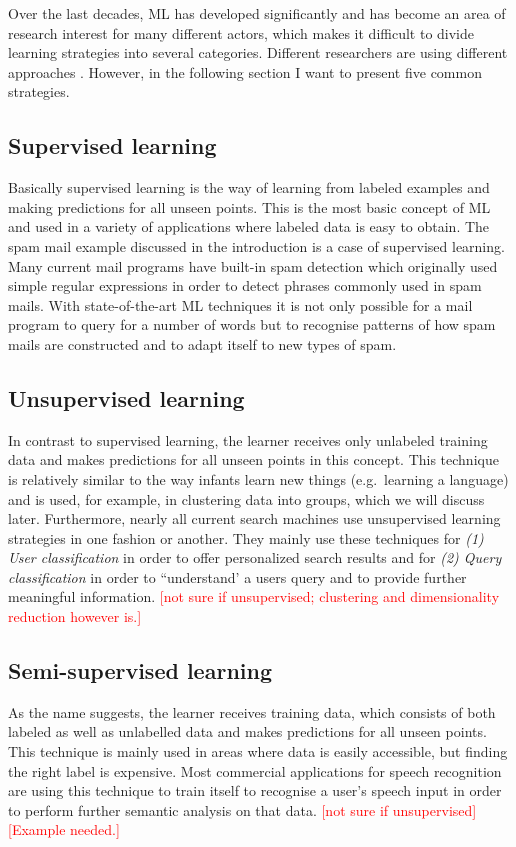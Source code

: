 \documentclass[conference]{IEEEtran}
\newcommand\notes[1]{\textcolor{red}{#1}}
\begin{document}
Over the last decades, ML has developed significantly and has become an area of
research interest for many different actors, which makes it difficult to divide learning 
strategies into several categories. Different researchers are using different approaches 
\cite{FoundationsOfML:mohri}\cite{Structure:corne}. 
However, in the following section I want to present five common strategies\cite{FoundationsOfML:mohri}.

\subsection{Supervised learning}
Basically supervised learning is the way of learning from labeled examples and making predictions 
for all unseen points. This is the most basic concept of ML and used in a variety of applications 
where labeled data is easy to obtain. The spam mail example discussed in the introduction is a 
case of supervised learning.
Many current mail programs have built-in spam detection which originally used
simple regular expressions in order to detect phrases commonly used in spam mails.
With state-of-the-art ML techniques it is not only possible for a mail program to 
query for a number of words but to recognise patterns of how spam mails are constructed and 
to adapt itself to new types of spam.

\subsection{Unsupervised learning}
In contrast to supervised learning, the learner receives only 
unlabeled training data and makes predictions for all unseen points in this concept. This technique is 
relatively similar to the way infants learn new things (e.g.\ learning a language) and 
is used, for example, in clustering data into groups, which we will discuss later\cite{BrainInf:holzinger}.
Furthermore, nearly all current search machines use unsupervised learning strategies in one fashion or another. 
They mainly use these techniques for \textit{(1) User classification}\cite{DisciplineOfML:mitchell} in order to offer personalized 
search results and for \textit{(2) Query classification} in order to ``understand' a 
users query and to provide further meaningful information. 
\notes{[not sure if unsupervised; clustering and dimensionality reduction however is.]}

\subsection{Semi-supervised learning}
As the name suggests, the learner receives training data, which consists of both 
labeled as well as unlabelled data and makes predictions for all unseen points.
This technique is mainly used in areas where data is easily accessible, 
but finding the right label is expensive.
Most commercial applications for speech recognition are using this technique to train itself to 
recognise a user's speech input in order to perform further semantic analysis on
that data. \notes{[not sure if unsupervised]}
\notes{[Example needed.]}
\end{document}

